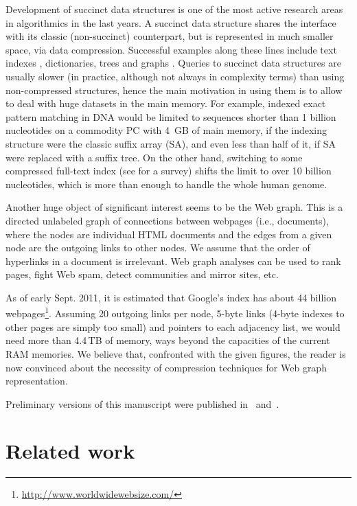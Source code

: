 \documentclass[envcountsame]{llncs}
\begin{document}
Development of succinct data structures is one of the most active research areas 
in algorithmics in the last years.  A succinct data structure shares the interface 
with its classic (non-succinct) counterpart, but is represented in much smaller 
space, via data compression.
Successful examples along these lines include text indexes \cite{NMacmcs06}, 
dictionaries, trees \cite{MR97,GearyRRR04} and graphs \cite{MR97}.
Queries to succinct data structures are usually slower (in practice, although 
not always in complexity terms) than using non-compressed structures, hence 
the main motivation in using them is to allow to deal with huge datasets in the 
main memory.
For example, indexed exact pattern matching in DNA would be limited to 
sequences shorter than 1 billion nucleotides on a commodity PC with 4~GB of 
main memory, if the indexing structure were the classic suffix array (SA), 
and even less than half of it, if SA were replaced with a suffix tree.  
On the other hand, switching to some compressed full-text index (see 
\cite{NMacmcs06} for a survey) shifts the limit to over 10 billion nucleotides, 
which is more than enough to handle the whole human genome.

Another huge object of significant interest seems to be the Web graph.  
This is a directed unlabeled graph of connections between webpages (i.e., documents), 
where the nodes are individual HTML documents and the edges from a given node 
are the outgoing links to other nodes.  We assume that the order of hyperlinks 
in a document is irrelevant.  
Web graph analyses can be used to rank pages, fight Web spam, detect communities 
and mirror sites, etc. 

As of early Sept. 2011, it is estimated that Google's index has about 44 billion 
webpages\footnote{\url{http://www.worldwidewebsize.com/}}.
Assuming 20 outgoing links per node, 5-byte links (4-byte indexes to other pages
are simply too small) and pointers to each adjacency list, we would need more 
than 4.4\,TB of memory, ways beyond the capacities of the current RAM memories.
We believe that, confronted with the given figures, the reader is now convinced 
about the necessity of compression techniques for Web graph representation.

Preliminary versions of this manuscript were published in~\cite{GB10} 
and~\cite{GB11}.



\section{Related work}
\label{sec:relatedwork}
\end{document}
